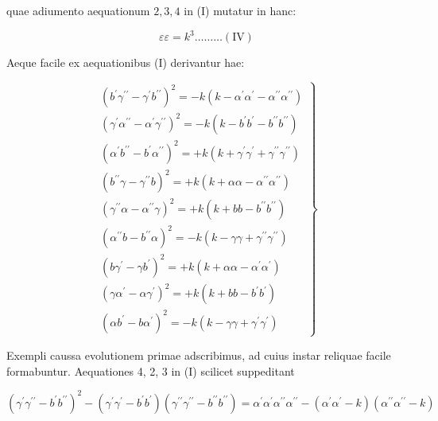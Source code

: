 \documentclass[twoside,12pt, showframe]{memoir}
\begin{document}
quae adiumento aequationum \(2,3,4\) in (I) mutatur in hanc:

\[
\varepsilon \varepsilon=k^{3} \ldots \ldots \ldots(\mathrm{IV})
\]

Aeque facile ex aequationibus (I) derivantur hae:

\[
\left.\begin{array}{l}
\left(b^{\prime} \gamma^{\prime \prime}-\gamma^{\prime} b^{\prime \prime}\right)^{2}=-k\left(k-\alpha^{\prime} \alpha^{\prime}-\alpha^{\prime \prime} \alpha^{\prime \prime}\right) \\
\left(\gamma^{\prime} \alpha^{\prime \prime}-\alpha^{\prime} \gamma^{\prime \prime}\right)^{2}=-k\left(k-b^{\prime} b^{\prime}-b^{\prime \prime} b^{\prime \prime}\right) \\
\left(\alpha^{\prime} b^{\prime \prime}-b^{\prime} \alpha^{\prime \prime}\right)^{2}=+k\left(k+\gamma^{\prime} \gamma^{\prime}+\gamma^{\prime \prime} \gamma^{\prime \prime}\right) \\
\left(b^{\prime \prime} \gamma-\gamma^{\prime \prime} b\right)^{2}=+k\left(k+\alpha \alpha-\alpha^{\prime \prime} \alpha^{\prime \prime}\right) \\
\left(\gamma^{\prime \prime} \alpha-\alpha^{\prime \prime} \gamma\right)^{2}=+k\left(k+b b-b^{\prime \prime} b^{\prime \prime}\right) \\
\left(\alpha^{\prime \prime} b-b^{\prime \prime} \alpha\right)^{2}=-k\left(k-\gamma \gamma+\gamma^{\prime \prime} \gamma^{\prime \prime}\right) \\
\left(b \gamma^{\prime}-\gamma b^{\prime}\right)^{2}=+k\left(k+\alpha \alpha-\alpha^{\prime} \alpha^{\prime}\right) \\
\left(\gamma \alpha^{\prime}-\alpha \gamma^{\prime}\right)^{2}=+k\left(k+b b-b^{\prime} b^{\prime}\right) \\
\left(\alpha b^{\prime}-b \alpha^{\prime}\right)^{2}=-k\left(k-\gamma \gamma+\gamma^{\prime} \gamma^{\prime}\right)
\end{array}\right\}
\]

Exempli caussa evolutionem primae adscribimus, ad cuius instar reliquae facile formabuntur. Aequationes 4, 2, 3 in (I) scilicet suppeditant

\[
\left(\gamma^{\prime} \gamma^{\prime \prime}-b^{\prime} b^{\prime \prime}\right)^{2}-\left(\gamma^{\prime} \gamma^{\prime}-b^{\prime} b^{\prime}\right)\left(\gamma^{\prime \prime} \gamma^{\prime \prime}-b^{\prime \prime} b^{\prime \prime}\right)=\alpha^{\prime} \alpha^{\prime} \alpha^{\prime \prime} \alpha^{\prime \prime}-\left(\alpha^{\prime} \alpha^{\prime}-k\right)\left(\alpha^{\prime \prime} \alpha^{\prime \prime}-k\right)
\]
\end{document}
